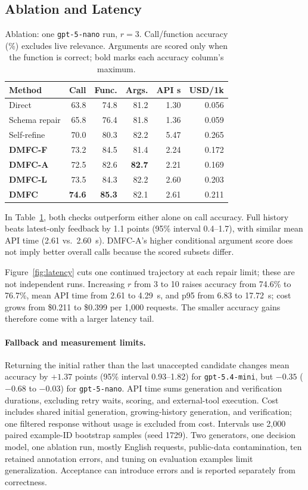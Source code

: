 \subsection{Ablation and Latency}
\begin{table}[t]
\centering\footnotesize
\setlength{\tabcolsep}{3pt}
\begin{tabular}{lrrrrr}
\toprule
Method & Call & Func. & Args. & API s & USD/1k\\
\midrule
Direct & 63.8 & 74.8 & 81.2 & 1.30 & 0.056 \\
Schema repair & 65.8 & 76.4 & 81.8 & 1.36 & 0.059 \\
Self-refine & 70.0 & 80.3 & 82.2 & 5.47 & 0.265 \\
\textbf{DMFC-F} & 73.2 & 84.5 & 81.4 & 2.24 & 0.172 \\
\textbf{DMFC-A} & 72.5 & 82.6 & \textbf{82.7} & 2.21 & 0.169 \\
\textbf{DMFC-L} & 73.5 & 84.3 & 82.2 & 2.60 & 0.203 \\
\textbf{DMFC} & \textbf{74.6} & \textbf{85.3} & 82.1 & 2.61 & 0.211 \\
\bottomrule
\end{tabular}
\caption{Ablation: one \texttt{gpt-5-nano} run, $r=3$. Call/function accuracy (\%) excludes live relevance. Arguments are scored only when the function is correct; bold marks each accuracy column's maximum.}
\label{tab:main}
\end{table}
In Table~\ref{tab:main}, both checks outperform either alone on call accuracy. Full history beats latest-only feedback by 1.1 points (95\% interval 0.4--1.7), with similar mean API time (2.61 vs.\ 2.60~s). DMFC-A's higher conditional argument score does not imply better overall calls because the scored subsets differ.


Figure~\ref{fig:latency} cuts one continued trajectory at each repair limit; these are not independent runs. Increasing $r$ from 3 to 10 raises accuracy from 74.6\% to 76.7\%, mean API time from 2.61 to 4.29~s, and p95 from 6.83 to 17.72~s; cost grows from \$0.211 to \$0.399 per 1,000 requests. The smaller accuracy gains therefore come with a larger latency tail.

\paragraph{Fallback and measurement limits.}
Returning the initial rather than the last unaccepted candidate changes mean accuracy by $+1.37$ points (95\% interval 0.93--1.82) for \texttt{gpt-5.4-mini}, but $-0.35$ ($-0.68$ to $-0.03$) for \texttt{gpt-5-nano}. API time sums generation and verification durations, excluding retry waits, scoring, and external-tool execution. Cost includes shared initial generation, growing-history generation, and verification; one filtered response without usage is excluded from cost. Intervals use 2,000 paired example-ID bootstrap samples (seed 1729). Two generators, one decision model, one ablation run, mostly English requests, public-data contamination, ten retained annotation errors, and tuning on evaluation examples limit generalization. Acceptance can introduce errors and is reported separately from correctness.

